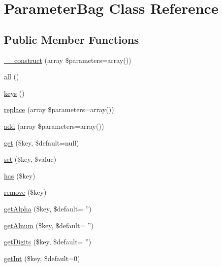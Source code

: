 \hypertarget{class_symfony_1_1_component_1_1_http_foundation_1_1_parameter_bag}{
\section{\-Parameter\-Bag \-Class \-Reference}
\label{class_symfony_1_1_component_1_1_http_foundation_1_1_parameter_bag}
}
\subsection*{\-Public \-Member \-Functions}
\begin{DoxyCompactItemize}
\item 
\hyperlink{class_symfony_1_1_component_1_1_http_foundation_1_1_parameter_bag_a2b35b581caacc83a91a6328fb8bcff1c}{\-\_\-\-\_\-construct} (array \$parameters=array())
\item 
\hyperlink{class_symfony_1_1_component_1_1_http_foundation_1_1_parameter_bag_af9d14e4ae6227970ad603987781573ca}{all} ()
\item 
\hyperlink{class_symfony_1_1_component_1_1_http_foundation_1_1_parameter_bag_a3b0db17d4be3aff5451d2764e7c88beb}{keys} ()
\item 
\hyperlink{class_symfony_1_1_component_1_1_http_foundation_1_1_parameter_bag_aecf1f176ed54728a1a55fdd65fc398e1}{replace} (array \$parameters=array())
\item 
\hyperlink{class_symfony_1_1_component_1_1_http_foundation_1_1_parameter_bag_a32aaa5d55ee0a6ecc24666f842908561}{add} (array \$parameters=array())
\item 
\hyperlink{class_symfony_1_1_component_1_1_http_foundation_1_1_parameter_bag_a499d39d1876a05b20e1ca8e8a1c2b466}{get} (\$key, \$default=null)
\item 
\hyperlink{class_symfony_1_1_component_1_1_http_foundation_1_1_parameter_bag_aab787bd83f84f4215dceb35f7c305eee}{set} (\$key, \$value)
\item 
\hyperlink{class_symfony_1_1_component_1_1_http_foundation_1_1_parameter_bag_a8b23dbb48f0c3c94725695191d06981a}{has} (\$key)
\item 
\hyperlink{class_symfony_1_1_component_1_1_http_foundation_1_1_parameter_bag_a95483af4e2c07dc9893fe058b026bd5d}{remove} (\$key)
\item 
\hyperlink{class_symfony_1_1_component_1_1_http_foundation_1_1_parameter_bag_a0efc269174192f5bb7437b6a6edaf45f}{get\-Alpha} (\$key, \$default= '')
\item 
\hyperlink{class_symfony_1_1_component_1_1_http_foundation_1_1_parameter_bag_a176ee6281615ea3ba404316b0c7a6623}{get\-Alnum} (\$key, \$default= '')
\item 
\hyperlink{class_symfony_1_1_component_1_1_http_foundation_1_1_parameter_bag_ac0dbfe6e1f4a957a7b9f64e065956ac2}{get\-Digits} (\$key, \$default= '')
\item 
\hyperlink{class_symfony_1_1_component_1_1_http_foundation_1_1_parameter_bag_af9aa0b1ab4864f18717bafcbb4183c69}{get\-Int} (\$key, \$default=0)
\end{DoxyCompactItemize}
